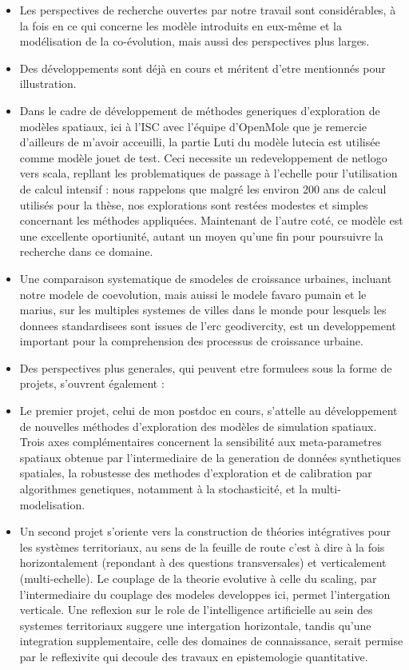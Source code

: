 \documentclass[11pt]{article}
\begin{document}
\begin{itemize}
	\item Les perspectives de recherche ouvertes par notre travail sont considérables, à la fois en ce qui concerne les modèle introduits en eux-même et la modélisation de la co-évolution, mais aussi des perspectives plus larges.
	\item Des développements sont déjà en cours et méritent d'etre mentionnés pour illustration.
	\item Dans le cadre de développement de méthodes generiques d'exploration de modèles spatiaux, ici à l'ISC avec l'équipe d'OpenMole que je remercie d'ailleurs de m'avoir acceuilli, la partie Luti du modèle lutecia est utilisée comme modèle jouet de test. Ceci necessite un redeveloppement de netlogo vers scala, repllant les problematiques de passage à l'echelle pour l'utilisation de calcul intensif : nous rappelons que malgré les environ 200 ans de calcul utilisés pour la thèse, nos explorations sont restées modestes et simples concernant les méthodes appliquées. Maintenant de l'autre coté, ce modèle est une excellente oportiunité, autant un moyen qu'une fin pour poursuivre la recherche dans ce domaine.
	\item Une comparaison systematique de smodeles de croissance urbaines, incluant notre modele de coevolution, mais auissi le modele favaro pumain et le marius, sur les multiples systemes de villes dans le monde pour lesquels les donnees standardisees sont issues de l'erc geodivercity, est un developpement important pour la comprehension des processus de croissance urbaine.
	\item Des perspectives plus generales, qui peuvent etre formulees sous la forme de projets, s'ouvrent également :
	\item Le premier projet, celui de mon postdoc en cours, s'attelle au développement de nouvelles méthodes d'exploration des modèles de simulation spatiaux. Trois axes complémentaires concernent la sensibilité aux meta-parametres spatiaux obtenue par l'intermediaire de la generation de données synthetiques spatiales, la robustesse des methodes d'exploration et de calibration par algorithmes genetiques, notamment à la stochasticité, et la multi-modelisation.
	\item Un second projet s'oriente vers la construction de théories intégratives pour les systèmes territoriaux, au sens de la feuille de route c'est à dire à la fois horizontalement (repondant à des questions transversales) et verticalement (multi-echelle). Le couplage de la theorie evolutive à celle du scaling, par l'intermediaire du couplage des modeles developpes ici, permet l'intergation verticale. Une reflexion sur le role de l'intelligence artificielle au sein des systemes territoriaux suggere une intergation horizontale, tandis qu'une integration supplementaire, celle des domaines de connaissance, serait permise par le reflexivite qui decoule des travaux en epistemologie quantitative.
\end{itemize}
\end{document}
